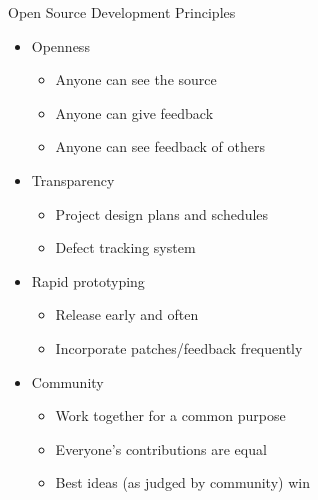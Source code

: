 \documentclass{beamer}
\begin{document}
\begin{frame}{Open Source Development Principles}
\begin{itemize}
\item Openness
\begin{itemize}
\item Anyone can see the source
\item Anyone can give feedback
\item Anyone can see feedback of others
\end{itemize}
\item Transparency
\begin{itemize}
\item Project design plans and schedules
\item Defect tracking system
\end{itemize}
\item Rapid prototyping
\begin{itemize}
\item Release early and often
\item Incorporate patches/feedback frequently
\end{itemize}
\item Community
\begin{itemize}
\item Work together for a common purpose
\item Everyone's contributions are equal
\item Best ideas (as judged by community) win
\end{itemize}
\end{itemize}
\end{frame}
\end{document}
